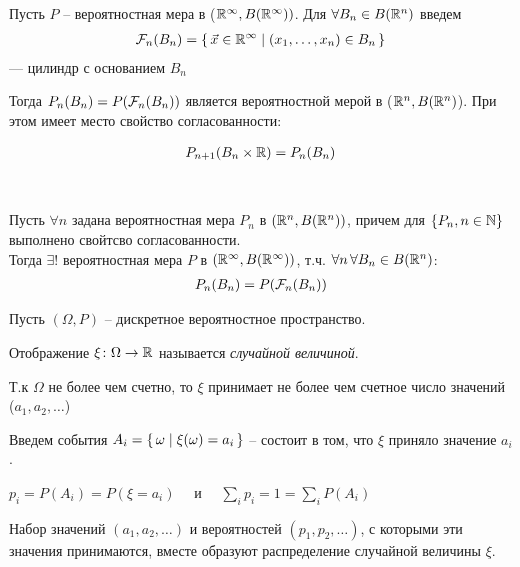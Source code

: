 
Пусть $P$ -- вероятностная мера в ($\mathbb{R}^{\infty}, B(\mathbb{R}^{\infty}))$.
Для $\forall B_n \in B(\mathbb{R}^n)$ введем
\begin{align*}
	\mathcal{F}_n (B_n) = \left\{ \, \vec{x} \in \mathbb{R}^{\infty} \mid (x_1, \ldots, x_n) \in B_n \, \right\}
\end{align*}
--- цилиндр с основанием $B_n$

Тогда $P_n(B_n) = P(\mathcal{F}_n(B_n))$ является вероятностной мерой в ($\mathbb{R}^n, B(\mathbb{R}^n)$).
При этом имеет место свойство согласованности:

\begin{align*}
	P_{n + 1}(B_n \times \mathbb{R}) = P_n(B_n)
\end{align*}

\begin{theorem}~

	Пусть $\forall n$ задана вероятностная мера $P_n$  в $(\mathbb{R}^n, B(\mathbb{R}^n))$, 
	причем для $\{ P_n, n \in \mathbb{N} \}$ выполнено свойтсво согласованности.\\
	Тогда $\exists !$ вероятностная мера $P$ в $(\mathbb{R}^{\infty}, B(\mathbb{R}^{\infty}))$,
	т.ч. $\forall n \, \forall B_n \in B(\mathbb{R}^n)$:
	\begin{align*}
		P_n(B_n) = P(\mathcal{F}_n(B_n))
	\end{align*}
\end{theorem}


Пусть $(\Omega, P)$ -- дискретное вероятностное пространство.

\begin{definition}
	Отображение $\xi\colon \Omega \to \mathbb{R}$ называется \emph{случайной величиной}.

	Т.к $\Omega$ не более чем счетно, 
	то $\xi$ принимает не более чем счетное число значений ($a_1, a_2, \ldots$)

	Введем события $A_i = \left\{ \, \omega \mid \xi(\omega) = a_i \, \right\}$ 
	-- состоит в том, что $\xi$ приняло значение $a_i$.
	
	$p_i = P(A_i) = P(\xi = a_i) \quad$ и $\quad \sum\limits_i p_i = 1 = \sum\limits_i P(A_i)$
\end{definition}

\begin{definition}
	Набор значений $(a_1, a_2, \ldots)$ и вероятностей $(p_1, p_2, \ldots)$, с которыми эти значения принимаются, вместе образуют распределение случайной величины $\xi$.
\end{definition}


